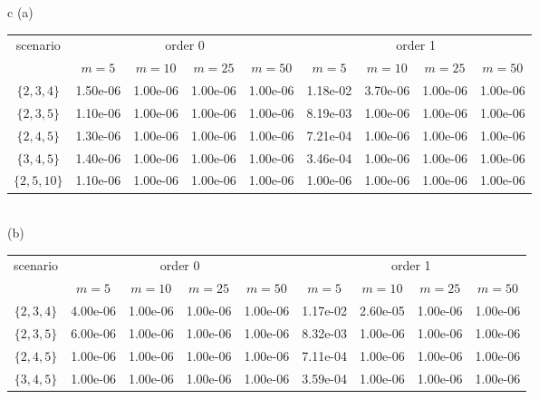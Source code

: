 \documentclass[12pt]{article}
\begin{document}
\begin{appendices}
\begin{table}[htbp]
	\centering
	\begin{tabular}{c}
		(a) \\ 
		\begin{subtable}{\textwidth}
			\centering
			\begin{tabular}{ccccccccc}
				\hline
				\multirow{2}{*}{scenario} & \multicolumn{4}{c}{order 0} & \multicolumn{4}{c}{order 1} \\ \cline{2-9}
				& $m=5$     & $m=10$ & $m=25$ & $m=50$ & $m=5$     & $m=10$ & $m=25$ & $m=50$ \\ \hline
				$\lbrace 2,3,4\rbrace$ & 1.50e-06 & 1.00e-06 & 1.00e-06 & 1.00e-06 & 1.18e-02 & 3.70e-06 & 1.00e-06 & 1.00e-06 \\ 
				$\lbrace 2,3,5\rbrace$ & 1.10e-06 & 1.00e-06 & 1.00e-06 & 1.00e-06 & 8.19e-03 & 1.00e-06 & 1.00e-06 & 1.00e-06 \\ 
				$\lbrace 2,4,5\rbrace$ & 1.30e-06 & 1.00e-06 & 1.00e-06 & 1.00e-06 & 7.21e-04 & 1.00e-06 & 1.00e-06 & 1.00e-06 \\
				$\lbrace 3,4,5\rbrace$ & 1.40e-06 & 1.00e-06 & 1.00e-06 & 1.00e-06 & 3.46e-04 & 1.00e-06 & 1.00e-06 & 1.00e-06 \\ 
				$\lbrace 2,5,10\rbrace$& 1.10e-06 & 1.00e-06 & 1.00e-06 & 1.00e-06 & 1.00e-06 & 1.00e-06 & 1.00e-06 & 1.00e-06 \\ 
				\hline
			\end{tabular}
		\end{subtable}%
		\\ (b) \\
		\begin{subtable}{\textwidth}
			\centering
			\begin{tabular}{ccccccccc}
				\hline
				\multirow{2}{*}{scenario} & \multicolumn{4}{c}{order 0} & \multicolumn{4}{c}{order 1} \\ \cline{2-9}
				& $m=5$     & $m=10$ & $m=25$ & $m=50$ & $m=5$     & $m=10$ & $m=25$ & $m=50$ \\ \hline
				$\lbrace 2,3,4\rbrace$ & 4.00e-06 & 1.00e-06 & 1.00e-06 & 1.00e-06 & 1.17e-02 & 2.60e-05 & 1.00e-06 & 1.00e-06 \\ 
				$\lbrace 2,3,5\rbrace$ & 6.00e-06 & 1.00e-06 & 1.00e-06 & 1.00e-06 & 8.32e-03 & 1.00e-06 & 1.00e-06 & 1.00e-06 \\ 
				$\lbrace 2,4,5\rbrace$ & 1.00e-06 & 1.00e-06 & 1.00e-06 & 1.00e-06 & 7.11e-04 & 1.00e-06 & 1.00e-06 & 1.00e-06 \\ 
				$\lbrace 3,4,5\rbrace$ & 1.00e-06 & 1.00e-06 & 1.00e-06 & 1.00e-06 & 3.59e-04 & 1.00e-06 & 1.00e-06 & 1.00e-06 \\ 

\end{tabular}
\end{subtable}
\end{tabular}
\end{table}
\end{appendices}
\end{document}
